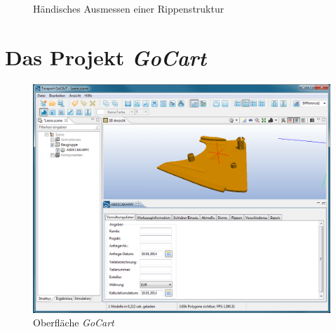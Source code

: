 \begin{figure}[ht]
    \centering 
\caption{H\"andisches Ausmessen einer Rippenstruktur} 
\label{im:domes}
\end{figure} 


\section{Das Projekt \textit{GoCart}}
\label{sec:goCart}

\begin{figure}[H]
\centerline{
	\includegraphics[width=0.95\columnwidth]{graphics/goCart.png}}
\caption{Oberfl\"ache \textit{GoCart}}
\label{im:goCart}
\end{figure}

